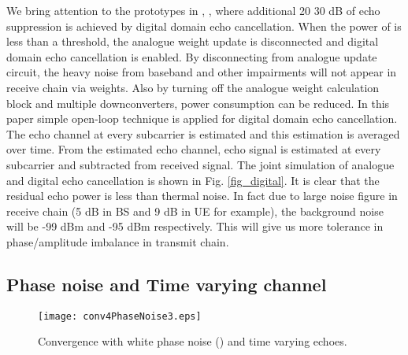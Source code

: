 \documentclass[twocolumn]{IEEEtran}
\begin{document}
We bring attention to the prototypes in \cite{stanford},
\cite{mac2}, \cite{rice1} where additional 20  30 dB of echo
suppression is achieved by digital domain echo cancellation. When
the power of  is less than a threshold, the analogue weight
update is disconnected and digital domain echo cancellation is
enabled. By disconnecting from analogue update circuit, the heavy
noise from baseband and other impairments will not appear in receive
chain via weights. Also by turning off the analogue weight
calculation block and multiple downconverters, power consumption can
be reduced. In this paper simple open-loop technique is applied for
digital domain echo cancellation. The echo channel at every
subcarrier is estimated and this estimation is averaged over time.
From the estimated echo channel, echo signal is estimated at every
subcarrier and subtracted from received signal. The joint simulation
of analogue and digital echo cancellation is shown in Fig.
\ref{fig_digital}. It is clear that the residual echo power is less
than thermal noise. In fact due to large noise figure in receive
chain (5 dB in BS and 9 dB in UE for example), the background noise
will be -99 dBm and -95 dBm respectively. This will give us more
tolerance in phase/amplitude imbalance in transmit chain.

\subsection{Phase noise and Time varying channel}



\begin{figure}[!t]

\centering
    {\texttt{[image: conv4PhaseNoise3.eps]}}


\caption{Convergence with white phase noise () and
time varying echoes. \label{fig_convPhaseNoise} }

\end{figure}
\end{document}
